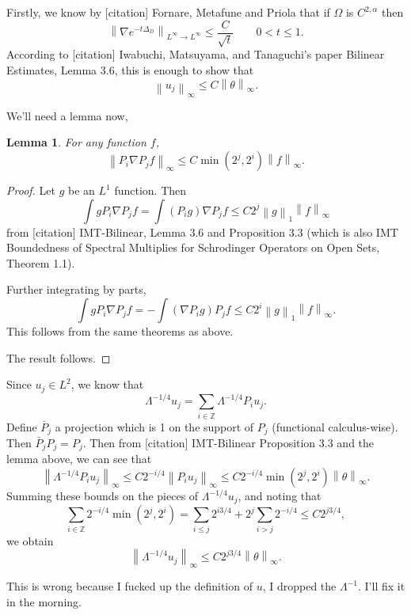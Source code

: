 \documentclass[11pt]{amsart}
\newtheorem{lemma}[theorem]{Lemma}
\theoremstyle{remark}
\newcommand{\Z}{\mathbb{Z}}
\newcommand{\norm}[1]{\left\lVert#1\right\rVert}
\newcommand{\grad}{\nabla}
\newcommand{\Laplace}{\Delta}
\begin{document}
Firstly, we know by [citation] Fornare, Metafune and Priola that if $\Omega$ is $C^{2,\alpha}$ then
\[ \norm{\grad e^{-t\Laplace_D}}_{L^\infty \to L^\infty} \leq \frac{C}{\sqrt{t}} \qquad 0 < t \leq 1. \]
According to [citation] Iwabuchi, Matsuyama, and Tanaguchi's paper Bilinear Estimates, Lemma 3.6, this is enough to show that
\[ \norm{u_j}_\infty \leq C \norm{\theta}_\infty. \]

We'll need a lemma now,
\begin{lemma}
For any function $f$,
\[ \norm{P_i \grad P_j f}_\infty \leq C \min(2^j,2^i) \norm{f}_\infty. \]
\end{lemma}
\begin{proof}
Let $g$ be an $L^1$ function.  Then
\[ \int g P_i \grad P_j f = \int (P_i g) \grad P_j f \leq C 2^j \norm{g}_1 \norm{f}_\infty \]
from [citation] IMT-Bilinear, Lemma 3.6 and Proposition 3.3 (which is also IMT Boundedness of Spectral Multiplies for Schrodinger Operators on Open Sets, Theorem 1.1).  

Further integrating by parts,
\[ \int g P_i \grad P_j f = - \int (\grad P_i g) P_j f \leq C 2^i \norm{g}_1 \norm{f}_\infty. \]
This follows from the same theorems as above.  

The result follows.  
\end{proof}

Since $u_j \in L^2$, we know that
\[ \Lambda^{-1/4} u_j = \sum_{i \in \Z} \Lambda^{-1/4} P_i u_j. \]
Define $\bar{P}_j$ a projection which is 1 on the support of $P_j$ (functional calculus-wise).  Then $\bar{P}_j P_j = P_j$.  Then from [citation] IMT-Bilinear Proposition 3.3 and the lemma above, we can see that
\[ \norm{\Lambda^{-1/4} P_i u_j}_\infty \leq C 2^{-i/4} \norm{P_i u_j}_\infty \leq C 2^{-i/4} \min(2^j,2^i) \norm{\theta}_\infty. \]
Summing these bounds on the pieces of $\Lambda^{-1/4} u_j$, and noting that
\[ \sum_{i \in \Z} 2^{-i/4} \min(2^j,2^i) = \sum_{i \leq j} 2^{i 3/4} + 2^j \sum_{i>j} 2^{-i/4} \leq C 2^{j 3/4}, \]
we obtain
\[ \norm{\Lambda^{-1/4} u_j}_\infty \leq C 2^{j 3/4} \norm{\theta}_\infty. \]

This is wrong because I fucked up the definition of $u$, I dropped the $\Lambda^{-1}$.  I'll fix it in the morning.  
\end{document}
